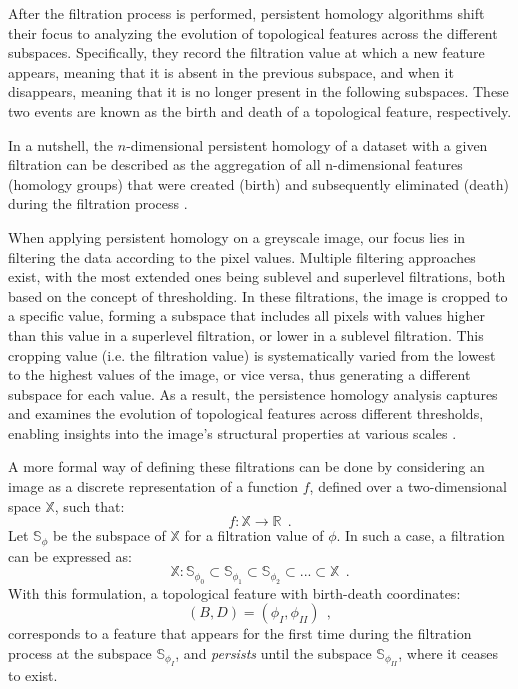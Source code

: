 \documentclass[12pt]{mythesis}
\begin{document}
After the filtration process is performed, persistent homology algorithms shift their focus to analyzing the evolution of topological features across the different subspaces. Specifically, they record the filtration value at which a new feature appears, meaning that it is absent in the previous subspace, and when it disappears, meaning that it is no longer present in the following subspaces. These two events are known as the birth and death of a topological feature, respectively. 

In a nutshell, the $n$-dimensional persistent homology of a dataset with a given filtration can be described as the aggregation of all n-dimensional features (homology groups) that were created (birth) and subsequently eliminated (death) during the filtration process \citep{ph_filtration}.

When applying persistent homology on a greyscale image, our focus lies in filtering the data according to the pixel values. Multiple filtering approaches exist, with the most extended ones being sublevel and superlevel filtrations, both based on the concept of thresholding. In these filtrations, the image is cropped to a specific value, forming a subspace that includes all pixels with values higher than this value in a superlevel filtration, or lower in a sublevel filtration. This cropping value (i.e. the filtration value) is systematically varied from the lowest to the highest values of the image, or vice versa, thus generating a different subspace for each value. As a result, the persistence homology analysis captures and examines the evolution of topological features across different thresholds, enabling insights into the image's structural properties at various scales \citep{ph_image_filtration}.

A more formal way of defining these filtrations can be done by considering an image as a discrete representation of a function $f$, defined over a two-dimensional space $\mathbb{X}$, such that: 
\begin{equation}
    f :  \mathbb{X} \longrightarrow  \mathbb{R} \ \ .
\end{equation}
Let $\mathbb{S} _\phi$ be the subspace of $\mathbb{X}$ for a filtration value of $\phi$. In such a case, a filtration can be expressed as:
\begin{equation}
    \mathbb{X}: \mathbb{S}_{\phi_0} \subset \mathbb{S}_{\phi_1} \subset \mathbb{S}_{\phi_2}\subset... \subset \mathbb{X}\ \ .
\end{equation}
With this formulation, a topological feature with birth-death coordinates:
\begin{equation}
(B, D) = (\phi_ I, \phi _ {II}) \ \ ,
\end{equation} 
corresponds to a feature that appears for the first time during the filtration process at the subspace $\mathbb{S}_{\phi _ I}$, and \textit{persists} until the subspace $\mathbb{S}_{\phi _ {II}}$, where it ceases to exist.
\end{document}
